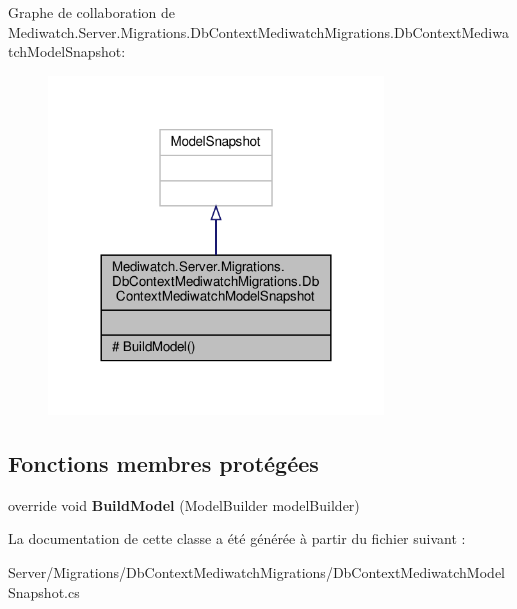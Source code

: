 Graphe de collaboration de Mediwatch.\+Server.\+Migrations.\+Db\+Context\+Mediwatch\+Migrations.\+Db\+Context\+Mediwatch\+Model\+Snapshot\+:
\nopagebreak
\begin{figure}[H]
\begin{center}
\leavevmode
\includegraphics[width=252pt]{class_mediwatch_1_1_server_1_1_migrations_1_1_db_context_mediwatch_migrations_1_1_db_context_med877236defc748ac970f0d300226712b8}
\end{center}
\end{figure}
\subsection*{Fonctions membres protégées}
\begin{DoxyCompactItemize}
\item 
\mbox{\label{class_mediwatch_1_1_server_1_1_migrations_1_1_db_context_mediwatch_migrations_1_1_db_context_mediwatch_model_snapshot_a8cd3af8a526962ffea2f87f15691a207}} 
override void {\bfseries Build\+Model} (Model\+Builder model\+Builder)
\end{DoxyCompactItemize}


La documentation de cette classe a été générée à partir du fichier suivant \+:\begin{DoxyCompactItemize}
\item 
Server/\+Migrations/\+Db\+Context\+Mediwatch\+Migrations/Db\+Context\+Mediwatch\+Model\+Snapshot.\+cs\end{DoxyCompactItemize}
